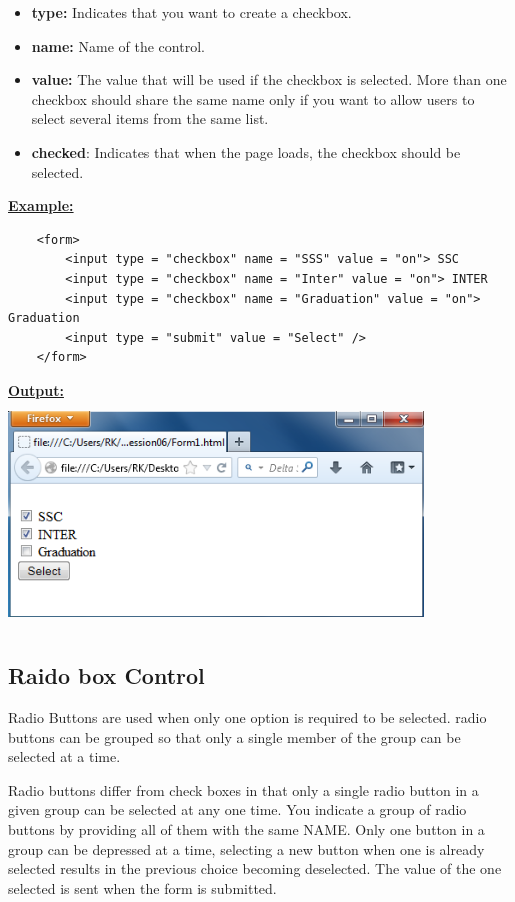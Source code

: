 \documentclass[11pt,a4paper]{article}
\begin{document}
\begin{itemize}
\item \textbf{type:} Indicates that you want to create a checkbox.
\item \textbf{name:} Name of the control.
\item \textbf{value:} The value that will be used if the checkbox is selected. More than one checkbox should share the same name only if you want to allow users to select several items from the same list.
\item \textbf{checked}: Indicates that when the page loads, the checkbox should be selected.
\end{itemize}
\underline{\textbf{Example:}}
\begin{verbatim}
    <form>
        <input type = "checkbox" name = "SSS" value = "on"> SSC
        <input type = "checkbox" name = "Inter" value = "on"> INTER
        <input type = "checkbox" name = "Graduation" value = "on"> Graduation
        <input type = "submit" value = "Select" />
    </form>
\end{verbatim}
\underline{\textbf{Output:}}\\
\includegraphics[height = 60mm, width = 110mm]{Form7.png}
\subsection*{Raido box Control}
Radio Buttons are used when only one option is required to be selected. radio buttons can be grouped so that only a single member of the group can be selected at a time.

Radio buttons differ from check boxes in that only a single radio button in a given group can be selected at any one time. You indicate a group of radio buttons by providing all of them with the same NAME. Only one button in a group can be depressed at a time, selecting a new button when one is already selected results in the previous choice becoming deselected. The value of the one selected is sent when the form is submitted.\\
\end{document}
